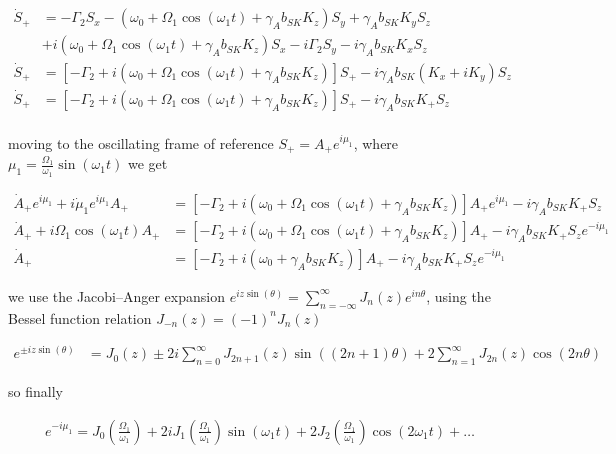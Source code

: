 \documentclass{article}
\begin{document}
\begin{align}
    \dot{S}_+ &= -\Gamma_2 S_x - \left(\omega_0 + \Omega_1 \cos{(\omega_{1} t)} + \gamma_{A}b_{SK}K_z\right) S_y + \gamma_{A}b_{SK}K_y S_z\\ &+ i\left(\omega_0 + \Omega_1 \cos{(\omega_{1} t)} + \gamma_{A}b_{SK}K_z\right) S_x -i\Gamma_2 S_y - i \gamma_{A}b_{SK}K_x S_z\\
   \dot{S}_+ &= \left[-\Gamma_2 + i\left(\omega_0 + \Omega_1 \cos{(\omega_{1} t)} + \gamma_{A}b_{SK}K_z\right) \right]S_+ - i \gamma_{A}b_{SK}\left(K_x +i K_y\right) S_z \\ 
   \dot{S}_+ &= \left[-\Gamma_2 + i\left(\omega_0 + \Omega_1 \cos{(\omega_{1} t)} + \gamma_{A}b_{SK}K_z\right) \right]S_+ - i \gamma_{A}b_{SK}K_+ S_z \\ 
\end{align}

moving to the oscillating frame of reference $S_+ = A_+ e^{i\mu_1}$, where $\mu_1 = \frac{\Omega_1}{\omega_1}\sin{\left(\omega_1 t\right)}$ we get

\begin{align}
    \dot{A}_+ e^{i\mu_1} + i\dot{\mu}_1e^{i\mu_1}A_+ &= \left[-\Gamma_2 + i\left(\omega_0 + \Omega_1 \cos{(\omega_{1} t)} + \gamma_{A}b_{SK}K_z\right) \right]A_+ e^{i\mu_1} - i \gamma_{A}b_{SK}K_+ S_z\\
    \dot{A}_+ + i\Omega_1 \cos{(\omega_{1} t)}A_+ &= \left[-\Gamma_2 + i\left(\omega_0 + \Omega_1 \cos{(\omega_{1} t)} + \gamma_{A}b_{SK}K_z\right) \right]A_+  - i \gamma_{A}b_{SK}K_+ S_z e^{-i\mu_1}\\
    \dot{A}_+  &= \left[-\Gamma_2 + i\left(\omega_0 + \gamma_{A}b_{SK}K_z\right) \right]A_+  - i \gamma_{A}b_{SK}K_+ S_z e^{-i\mu_1}\label{eq:alkali_rotating_frame}
\end{align}

we use the Jacobi–Anger expansion $e^{i z\sin{\left(\theta\right)}}=\sum_{n=-\infty}^{\infty}J_n\left(z\right)e^{i n \theta}$, using the Bessel function relation $J_{-n}(z) = (-1)^n J_n(z)$ 

\begin{align}
    e^{\pm i z\sin{\left(\theta\right)}} &= J_0\left(z\right)\pm 2i\sum_{n=0}^{\infty} J_{2n+1}\left(z\right)\sin{\left(\left(2n+1\right)\theta\right)}+2\sum_{n=1}^{\infty} J_{2n}\left(z\right)\cos{\left(2n\theta\right)} 
\end{align}

so finally


\begin{align}
        e^{-i\mu_1} = J_0\left(\frac{\Omega_1}{\omega_1}\right)+ 2i J_{1}\left(\frac{\Omega_1}{\omega_1}\right)\sin{\left(\omega_1 t\right)}+2 J_{2}\left(\frac{\Omega_1}{\omega_1}\right)\cos{\left(2\omega_1 t\right)}+\dots
\end{align}
\end{document}
